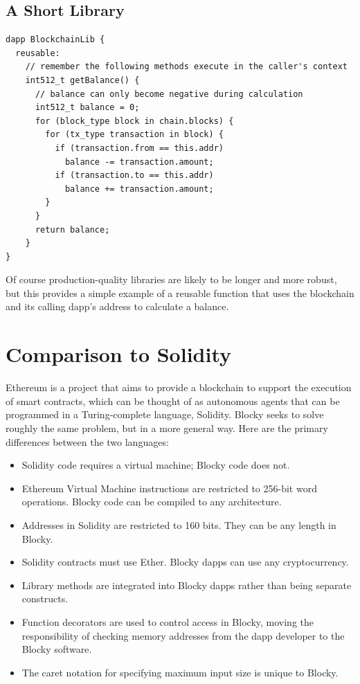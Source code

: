 \documentclass[letterpaper]{article}
\begin{document}
\subsection{A Short Library}
\begin{lstlisting}
dapp BlockchainLib {
  reusable:
    // remember the following methods execute in the caller's context
    int512_t getBalance() {
      // balance can only become negative during calculation
      int512_t balance = 0;
      for (block_type block in chain.blocks) {
        for (tx_type transaction in block) {
          if (transaction.from == this.addr)
            balance -= transaction.amount;
          if (transaction.to == this.addr)
            balance += transaction.amount;
        }
      }
      return balance;
    }
}
\end{lstlisting}
Of course production-quality libraries are likely to be longer and more robust, but this provides a simple example of a reusable function that uses the blockchain and its calling dapp's address to calculate a balance.
\newline

\section{Comparison to Solidity}
Ethereum is a project that aims to provide a blockchain to support the execution of smart contracts, which can be thought of as autonomous agents that can be programmed in a Turing-complete language, Solidity. Blocky seeks to solve roughly the same problem, but in a more general way. Here are the primary differences between the two languages:
\begin{itemize}
  \item{Solidity code requires a virtual machine\cite{ethereum15}; Blocky code does not.}
  \item{Ethereum Virtual Machine instructions are restricted to 256-bit word operations\cite{ethereum15}. Blocky code can be compiled to any architecture.}
  \item{Addresses in Solidity are restricted to 160 bits\cite{ethereum15}. They can be any length in Blocky.}
  \item{Solidity contracts must use Ether\cite{ethereum15}. Blocky dapps can use any cryptocurrency.}
  \item{Library methods are integrated into Blocky dapps rather than being separate constructs.}
  \item{Function decorators are used to control access in Blocky, moving the responsibility of checking memory addresses from the dapp developer to the Blocky software.}
  \item{The caret notation for specifying maximum input size is unique to Blocky.}
\end{itemize}
\end{document}
